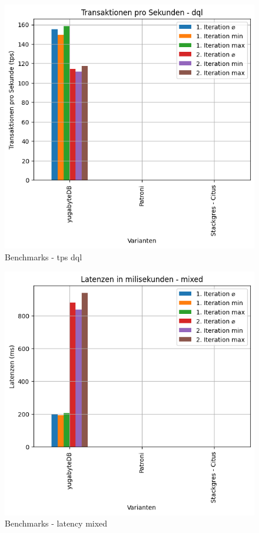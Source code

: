 \begin{flushleft}
    \begin{figure}[H]
        \centering
        \includegraphics[width=1\linewidth]{source/pandas_data_chart_plotter/tps_dql}
        \caption{Benchmarks - tps dql}
        \label{fig:tps_dql}
    \end{figure}

    \begin{figure}[H]
        \centering
        \includegraphics[width=1\linewidth]{source/pandas_data_chart_plotter/latency_mixed}
        \caption{Benchmarks - latency mixed}
        \label{fig:latency_mixed}
    \end{figure}


\end{flushleft}
